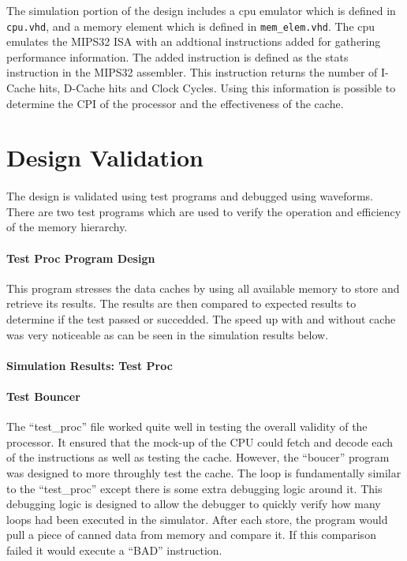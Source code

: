 \documentclass[11pt,letterpaper,]{article}
\begin{document}
The simulation portion of the design includes a cpu emulator which is defined in \verb|cpu.vhd|, and a memory element which is defined in \verb|mem_elem.vhd|.  The cpu emulates the MIPS32 ISA with an addtional instructions added for gathering performance information.  The added instruction is defined as the stats instruction in the MIPS32 assembler.  This instruction returns the number of I-Cache hits, D-Cache hits and Clock Cycles.  Using this information is possible to determine the CPI of the processor and the effectiveness of the cache.

\section{ Design Validation }
\label{Results}
\paragraph{}
The design is validated using test programs and debugged using waveforms. There are two test programs which are used to verify the operation and efficiency of the memory hierarchy.  
\paragraph{ Test Proc Program Design }
This program stresses the data caches by using all available memory to store and retrieve its results.  The results are then compared to expected results to determine if the test passed or succedded.  The speed up with and without cache was very noticeable as can be seen in the simulation results below.  
\paragraph{ Simulation Results: Test Proc }

\paragraph{ Test Bouncer }
The ``test\_proc'' file worked quite well in testing the overall validity of the processor.  It ensured that the mock-up of the CPU could fetch and decode each of the instructions as well as testing the cache.  However, the ``boucer'' program was designed to more throughly test the cache.  The loop is fundamentally similar to the ``test\_proc'' except there is some extra debugging logic around it.  This debugging logic is designed to allow the debugger to quickly verify how many loops had been executed in the simulator.  After each store, the program would pull a piece of canned data from memory and compare it.  If this comparison failed it would execute a ``BAD'' instruction.
\end{document}
